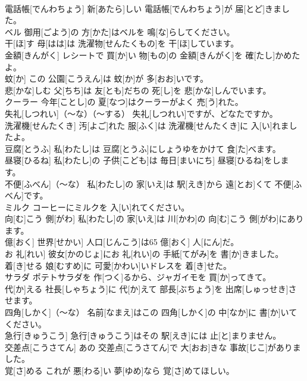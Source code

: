 \documentclass[8pt]{extreport}
\begin{document}
\begin{CJK}{UTF8}{min}
\\	電話帳[でんわちょう]	新[あたら]しい 電話帳[でんわちょう]が 届[とど]きました。		
\\	ベル	御用[ごよう]の 方[かた]はベルを 鳴[な]らしてください。		
\\	干[ほ]す	母[はは]は 洗濯物[せんたくもの]を 干[ほ]しています。		
\\	金額[きんがく]	レシートで 買[か]い 物[もの]の 金額[きんがく]を 確[たし]かめたよ。		
\\	蚊[か]	この 公園[こうえん]は 蚊[か]が 多[おお]いです。		
\\	悲[かな]しむ	父[ちち]は 友[とも]だちの 死[し]を 悲[かな]しんでいます。		
\\	クーラー	今年[ことし]の 夏[なつ]はクーラーがよく 売[う]れた。		
\\	失礼[しつれい]（～な）（～する）	失礼[しつれい]ですが、どなたですか。		
\\	洗濯機[せんたくき]	汚[よご]れた 服[ふく]は 洗濯機[せんたくき]に 入[い]れましたよ。		
\\	豆腐[とうふ]	私[わたし]は 豆腐[とうふ]にしょうゆをかけて 食[た]べます。		
\\	昼寝[ひるね]	私[わたし]の 子供[こども]は 毎日[まいにち] 昼寝[ひるね]をします。		
\\	不便[ふべん]（～な）	私[わたし]の 家[いえ]は 駅[えき]から 遠[とお]くて 不便[ふべん]です。		
\\	ミルク	コーヒーにミルクを 入[い]れてください。		
\\	向[む]こう 側[がわ]	私[わたし]の 家[いえ]は 川[かわ]の 向[む]こう 側[がわ]にあります。		
\\	億[おく]	世界[せかい] 人口[じんこう]は65 億[おく] 人[にん]だ。		
\\	お 礼[れい]	彼女[かのじょ]にお 礼[れい]の 手紙[てがみ]を 書[か]きました。		
\\	着[き]せる	娘[むすめ]に 可愛[かわい]いドレスを 着[き]せた。		
\\	サラダ	ポテトサラダを 作[つく]るから、ジャガイモを 買[か]ってきて。		
\\	代[か]える	社長[しゃちょう]に 代[か]えて 部長[ぶちょう]を 出席[しゅっせき]させます。		
\\	四角[しかく]（～な）	名前[なまえ]はこの 四角[しかく]の 中[なか]に 書[か]いてください。		
\\	急行[きゅうこう]	急行[きゅうこう]はその 駅[えき]には 止[と]まりません。		
\\	交差点[こうさてん]	あの 交差点[こうさてん]で 大[おお]きな 事故[じこ]がありました。		
\\	覚[さ]める	これが 悪[わる]い 夢[ゆめ]なら 覚[さ]めてほしい。		

\end{CJK}
\end{document}
